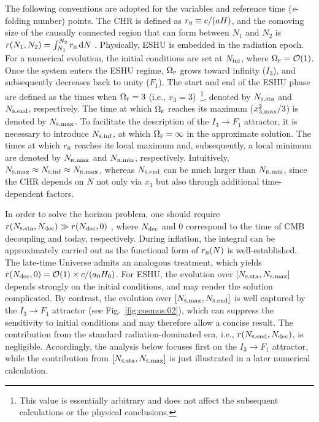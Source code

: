 \documentclass[aps,prd,twocolumn]{revtex4-2}
\newcommand\dx{{\rm d}}
\newcommand\subF{\textsc{f}}
\newcommand\subH{\textsc{h}}
\newcommand\subini{{\rm ini}}
\newcommand\subRmax{{\rm \textsc{r}.max}}
\newcommand\subRmin{{\rm \textsc{r}.min}}
\newcommand\subSsta{{\rm \textsc{s}.sta}}
\newcommand\subSmax{{\rm \textsc{s}.max}}
\newcommand\subSend{{\rm \textsc{s}.end}}
\newcommand\subSinf{{\rm \textsc{s}.inf}}
\newcommand\submax{{\rm max}}
\begin{document}
The following conventions are adopted for the variables and reference time (\textit{e}-folding number) points. The CHR is defined as $r_\subH\equiv c/(aH)$, and the comoving size of the causally connected region that can form between $N_1$ and $N_2$ is $r(N_1,N_2)=\int_{N_1}^{N_2}r_\subH\,\dx N$ \cite{Dodelson2020.book}. Physically, ESHU is embedded in the radiation epoch. For a numerical evolution, the initial conditions are set at $N_\subini$, where $\Omega_\subF=\mathcal{O}(1)$. Once the system enters the ESHU regime, $\Omega_\subF$ grows toward infinity ($I_3$), and subsequently decreases back to unity ($F_1$). The start and end of the ESHU phase are defined as the times when $\Omega_\subF=3$ (i.e., $x_3=3$)~\footnote{This value is essentially arbitrary and does not affect the subsequent calculations or the physical conclusions.}, denoted by $N_\subSsta$ and $N_\subSend$, respectively. The time at which $\Omega_\subF$ reaches its maximum ($x_{3,\submax}^2/3$) is denoted by $N_\subSmax$. To facilitate the description of the $I_3\rightarrow F_1$ attractor, it is necessary to introduce $N_\subSinf$, at which $\Omega_\subF=\infty$ in the approximate solution. The times at which $r_\subH$ reaches its local maximum and, subsequently, a local minimum are denoted by $N_\subRmax$ and $N_\subRmin$, respectively. Intuitively, $N_\subSmax\approx N_\subSinf\approx N_\subRmax$, whereas $N_\subSend$ can be much larger than $N_\subRmin$, since the CHR depends on $N$ not only via $x_3$ but also through additional time-dependent factors.

In order to solve the horizon problem, one should require $r(N_\subSsta,N_{\rm dec})\gg r(N_{\rm dec},0)$ \cite{Bassett2006.RMP.78.537}, where $N_{\rm dec}$ and $0$ correspond to the time of CMB decoupling and today, respectively. During inflation, the integral can be approximately carried out as the functional form of $r_\subH(N)$ is well-established. The late-time Universe admits an analogous treatment, which yields $r(N_{\rm dec},0)=\mathcal{O}(1)\times c/(a_0H_0)$. For ESHU, the evolution over $[N_\subSsta,N_\subSmax]$ depends strongly on the initial conditions, and may render the solution complicated. By contrast, the evolution over $[N_\subSmax,N_\subSend]$ is well captured by the $I_3\rightarrow F_1$ attractor (see Fig.~\ref{fig:cosmos:02}), which can suppress the sensitivity to initial conditions and may therefore allow a concise result. The contribution from the standard radiation-dominated era, i.e., $r(N_\subSend,N_{\rm dec})$, is negligible. Accordingly, the analysis below focuses first on the $I_3\rightarrow F_1$ attractor, while the contribution from $[N_\subSsta,N_\subSmax]$ is just illustrated in a later numerical calculation.
\end{document}
